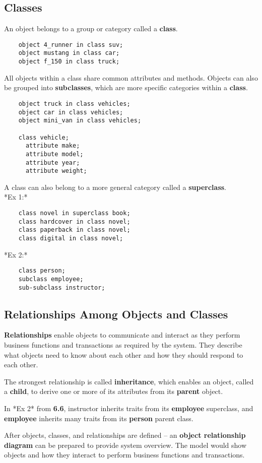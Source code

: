 \documentclass[12pt,a4paper]{article}
\begin{document}
\subsection{Classes}
An object belongs to a group or category called a \textbf{class}. 
\begin{verbatim}
    object 4_runner in class suv;
    object mustang in class car;
    object f_150 in class truck;
\end{verbatim}
All objects within a class share common attributes and methods. Objects can also be grouped into \textbf{subclasses}, which are more specific categories within a \textbf{class}.
\begin{verbatim}
    object truck in class vehicles;
    object car in class vehicles;
    object mini_van in class vehicles;

    class vehicle;
      attribute make;
      attribute model;
      attribute year;
      attribute weight;
\end{verbatim}
A class can also belong to a more general category called a \textbf{superclass}. \\
*Ex 1:*
\begin{verbatim}
    class novel in superclass book;
    class hardcover in class novel;
    class paperback in class novel;
    class digital in class novel;
\end{verbatim}
*Ex 2:*
\begin{verbatim}
    class person;
    subclass employee;
    sub-subclass instructor;
\end{verbatim}

\subsection{Relationships Among Objects and Classes}
\textbf{Relationships} enable objects to communicate and interact as they perform business functions and transactions as required by the system. They describe what objects need to know about each other and how they should respond to each other.

The strongest relationship is called \textbf{inheritance}, which enables an object, called a \textbf{child}, to derive one or more of its attributes from its \textbf{parent} object.

In *Ex 2* from \textbf{6.6}, instructor inherits traits from its \textbf{employee} superclass, and \textbf{employee} inherits many traits from its \textbf{person} parent class.

After objects, classes, and relationships are defined -- an \textbf{object relationship diagram} can be prepared to provide system overview. The model would show objects and how they interact to perform business functions and transactions.
\end{document}
